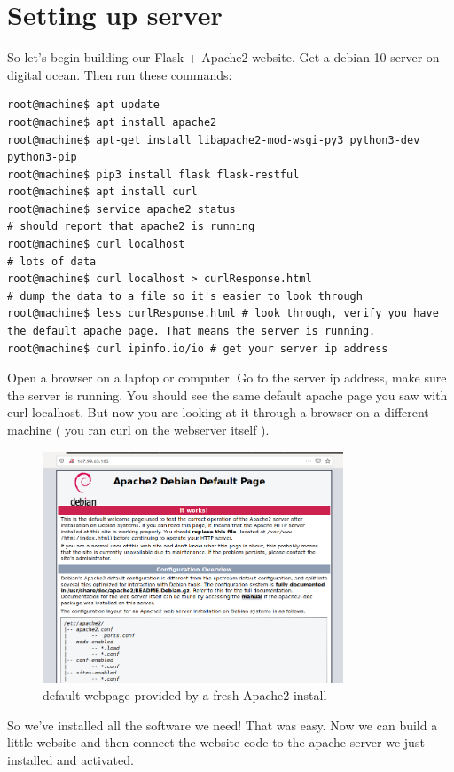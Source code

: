 \documentclass[10pt]{article}
\begin{document}
\section{Setting up server}
So let's begin building our Flask + Apache2 website. Get a debian 10 server on
digital ocean. Then run these commands:

\begin{lstlisting}[style=term]
root@machine$ apt update
root@machine$ apt install apache2
root@machine$ apt-get install libapache2-mod-wsgi-py3 python3-dev python3-pip
root@machine$ pip3 install flask flask-restful
root@machine$ apt install curl
root@machine$ service apache2 status
# should report that apache2 is running
root@machine$ curl localhost
# lots of data
root@machine$ curl localhost > curlResponse.html
# dump the data to a file so it's easier to look through
root@machine$ less curlResponse.html # look through, verify you have the default apache page. That means the server is running.
root@machine$ curl ipinfo.io/io # get your server ip address
\end{lstlisting}

Open a browser on a laptop or computer. Go to the server ip address, make sure the server is running. You should see the same default apache page you saw with curl localhost. But now you are looking at it through a browser on a different machine ( you ran curl on the webserver itself ).

\begin{figure}[h]
  \centering
    \includegraphics[width=0.8\textwidth]{defaultApache.png}
  \caption{default webpage provided by a fresh Apache2 install}
\end{figure}

So we've installed all the software we need! That was easy. Now we can build a little website and then connect the website code to the apache server we just installed and activated.
\end{document}
